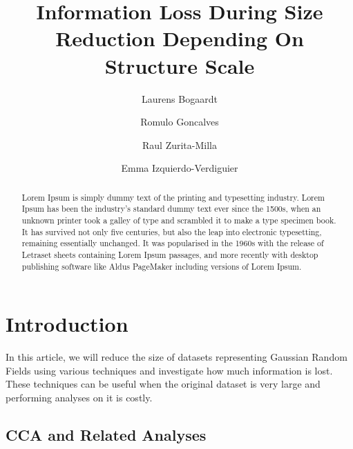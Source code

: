 \documentclass{acm_proc_article-sp}
\begin{document}
\title{\textbf{Information Loss During Size Reduction Depending On Structure Scale}}

\author[1]{Laurens Bogaardt}
\author[1]{Romulo Goncalves}
\author[2]{Raul Zurita-Milla}
\author[2,3]{Emma Izquierdo-Verdiguier}


\date{} %
\maketitle\thispagestyle{empty} %

\begin{abstract}
Lorem Ipsum is simply dummy text of the printing and typesetting industry. Lorem Ipsum has been the industry's standard dummy text ever since the 1500s, when an unknown printer took a galley of type and scrambled it to make a type specimen book. It has survived not only five centuries, but also the leap into electronic typesetting, remaining essentially unchanged. It was popularised in the 1960s with the release of Letraset sheets containing Lorem Ipsum passages, and more recently with desktop publishing software like Aldus PageMaker including versions of Lorem Ipsum.
\end{abstract}

\section{Introduction}
\label{sec:Introduction}

In this article, we will reduce the size of datasets representing Gaussian Random Fields using various techniques and investigate how much information is lost. These techniques can be useful when the original dataset is very large and performing analyses on it is costly.

\subsection{CCA and Related Analyses}
\label{sec:Introduction CCA and Related Analyses}
\end{document}
